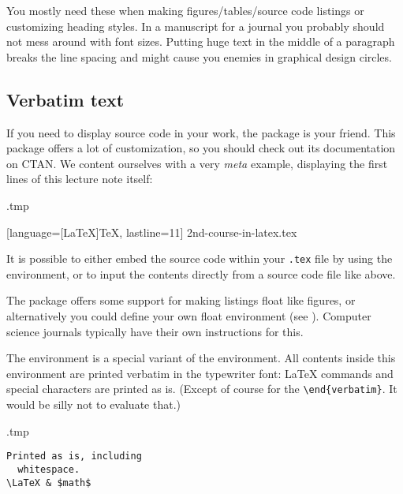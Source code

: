 You mostly need these when making figures/tables/source code listings
or customizing heading styles.
In a manuscript for a journal you probably should not mess around with font sizes.
Putting {\huge huge text} in the middle of a paragraph
breaks the line spacing and might cause you enemies in graphical design circles.


%
%
\subsection{Verbatim text}


If you need to display source code in your work,
the  package is your friend.
This package offers a lot of customization,
so you should check out its documentation on CTAN.
We content ourselves with a very \emph{meta} example,
displaying the first lines of this lecture note itself:
%
\begin{VerbatimOut}{\jobname.tmp}


  [language={[LaTeX]TeX}, lastline=11]
  {2nd-course-in-latex.tex}
\end{VerbatimOut}
\ShowExample
%
It is possible to either embed the source code within your \verb|.tex| file
by using the  environment,
or to input the contents directly from a source code file like above.

The package offers some support for making listings float like figures,
or alternatively you could define your own float environment (see ).
Computer science journals typically have their own instructions for this.

The  environment is a special variant of the  environment.
All contents inside this environment are printed verbatim
in the typewriter font: \LaTeX{} commands and special characters are printed as is.
(Except of course for the \verb|\end{verbatim}|.
It would be silly not to evaluate that.)

\begin{VerbatimOut}{\jobname.tmp}
\begin{verbatim}
Printed as is, including
  whitespace.
\LaTeX & $math$
\end{verbatim}
\end{VerbatimOut}
\ShowExample


